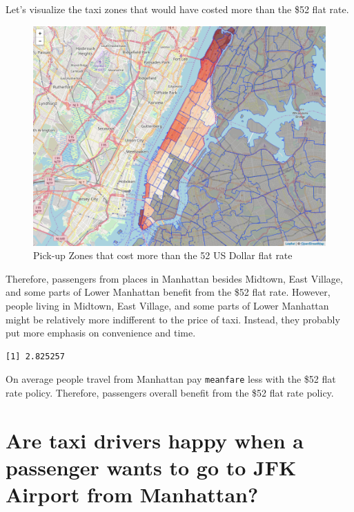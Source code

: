 \documentclass[12pt,twoside]{reedthesis}
\theoremstyle{definition}
\theoremstyle{definition}
\theoremstyle{definition}
\theoremstyle{remark}
\begin{document}
Let's visualize the taxi zones that would have costed more than the \$52
flat rate.
\begin{figure}

{\centering \includegraphics[width=4.96in]{figure/to_jfk_fare_above_vis} 

}

\caption{Pick-up Zones that cost more than the 52 US Dollar flat rate}\label{fig:to-jkf-fare-above-vis}
\end{figure}
Therefore, passengers from places in Manhattan besides Midtown, East
Village, and some parts of Lower Manhattan benefit from the \$52 flat
rate. However, people living in Midtown, East Village, and some parts of
Lower Manhattan might be relatively more indifferent to the price of
taxi. Instead, they probably put more emphasis on convenience and time.
\begin{verbatim}
[1] 2.825257
\end{verbatim}
On average people travel from Manhattan pay \texttt{meanfare} less with
the \$52 flat rate policy. Therefore, passengers overall benefit from
the \$52 flat rate policy.

\section{Are taxi drivers happy when a passenger wants to go to JFK
Airport from
Manhattan?}\label{are-taxi-drivers-happy-when-a-passenger-wants-to-go-to-jfk-airport-from-manhattan}
\end{document}
